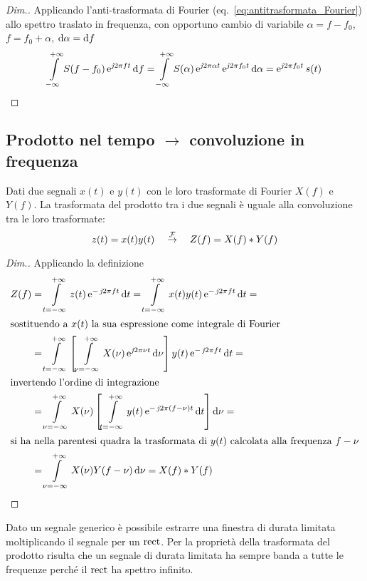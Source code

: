 \begin{proof}[Dim.]
Applicando l'anti-trasformata di Fourier (eq.~\ref{eq:antitrasformata_Fourier}) allo spettro traslato in frequenza, con opportuno cambio di variabile $\alpha=f-f_0$, $f=f_0+\alpha$, $\mathop{}\!\mathrm{d}\alpha=\mathop{}\!\mathrm{d} f$
\[
	\int\limits_{-\infty}^{+\infty}{S(f-f_0)\operatorname{e}^{\operatorname{\mathit{j}\!} 2\pi f t}}{\,\mathop{}\!\mathrm{d}{f}}=
	\int\limits_{-\infty}^{+\infty}{S(\alpha)\operatorname{e}^{\operatorname{\mathit{j}\!} 2\pi\alpha t}\operatorname{e}^{\operatorname{\mathit{j}\!} 2\pi f_0 t}}{\,\mathop{}\!\mathrm{d}{\alpha}}=\operatorname{e}^{\operatorname{\mathit{j}\!} 2\pi f_0 t} s(t)
\qedhere
\]
\end{proof}

\subsection{Prodotto nel tempo \texorpdfstring{$\to$}{come} convoluzione in frequenza}
Dati due segnali $x(t)$ e $y(t)$ con le loro trasformate di Fourier $X(f)$ e $Y(f)$. La trasformata del prodotto tra i due segnali è uguale alla convoluzione tra le loro trasformate:
\begin{equation}
	z(t)=x(t) y(t)\quad\overset{\operatorname{\mathcal{F}}}{\rightarrow}\quad Z(f)=X(f)\ast Y(f)
\end{equation}

\begin{proof}[Dim.] Applicando la definizione
\begin{align*}
	Z(f)&=\intd{t=-\infty}{+\infty}{z(t)\e{-\imath 2\pi f t}}{t}=\intd{t=-\infty}{+\infty}{x(t)y(t)\e{-\imath 2\pi f t}}{t}=\\
\intertext{sostituendo a $x(t)$ la sua espressione come integrale di Fourier}
	&=\intd{t=-\infty}{+\infty}{\left[\intd{\nu=-\infty}{+\infty}{X(\nu)\e{\imath 2\pi\nu t}}{\nu}\right]y(t)\e{-\imath 2\pi f t}}{t}=\\
\intertext{invertendo l'ordine di integrazione}
	&=\intd{\nu=-\infty}{+\infty}{X(\nu)\left[\intd{t=-\infty}{+\infty}{y(t)\e{-\imath 2\pi(f-\nu)t}}{t}\right]}{\nu}=\\
\intertext{si ha nella parentesi quadra la trasformata di $y(t)$ calcolata alla frequenza $f-\nu$}
	&=\intd{\nu=-\infty}{+\infty}{X(\nu)Y(f-\nu)}{\nu} = X(f)\ast Y(f)
\qedhere
\end{align*}
\end{proof}

\begin{nota}
	Dato un segnale generico è possibile estrarre una finestra di durata limitata moltiplicando il segnale per un $\operatorname{rect}$. Per la proprietà della trasformata del prodotto risulta che un segnale di durata limitata ha sempre banda a tutte le frequenze perché il $\operatorname{rect}$ ha spettro infinito.
\end{nota}

